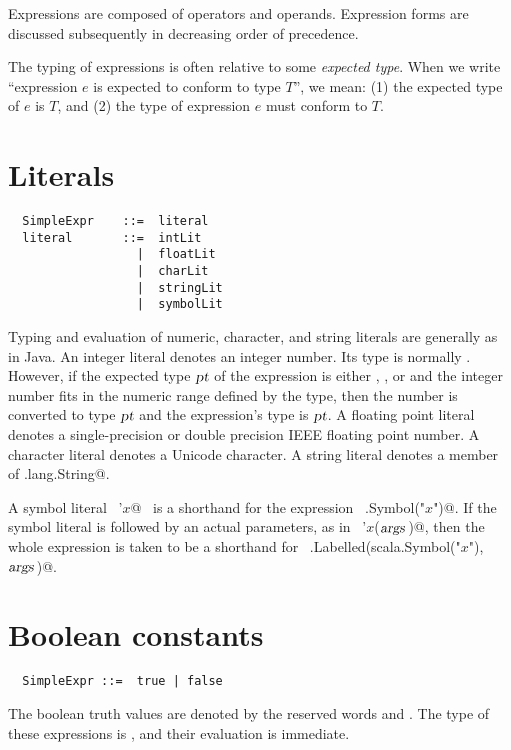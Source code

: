 \documentclass[a4paper,12pt,twoside,titlepage]{book}
\newcommand{\args}{\mbox{\sl args}}
\newcommand{\proto}{\mbox{\sl pt}}
\begin{document}
Expressions are composed of operators and operands. Expression forms are
discussed subsequently in decreasing order of precedence. 

The typing of expressions is often relative to some {\em expected
type}.  When we write ``expression $e$ is expected to conform to
type $T$'', we mean: (1) the expected type of $e$ is
$T$, and (2) the type of expression $e$ must conform to
$T$.

\section{Literals}

\syntax\begin{lstlisting}
  SimpleExpr    ::=  literal
  literal       ::=  intLit
                  |  floatLit
                  |  charLit
                  |  stringLit
                  |  symbolLit
\end{lstlisting}

Typing and evaluation of numeric, character, and string literals are
generally as in Java.  An integer literal denotes an integer
number. Its type is normally . However, if the expected type
$\proto$ of the expression is either , , or
 and the integer number fits in the numeric range defined
by the type, then the number is converted to type $\proto$ and the
expression's type is $\proto$.  A floating point literal denotes a
single-precision or double precision IEEE floating point number. A
character literal denotes a Unicode character. A string literal
denotes a member of \lstinline@java.lang.String@.

A symbol literal ~\lstinline@'$x$@~ is a shorthand for the expression
~\lstinline@scala.Symbol("$x$")@. If the symbol literal is followed by an
actual parameters, as in ~\lstinline@'$x$($\args\,$)@, then the whole expression
is taken to be a shorthand for
~\lstinline@scala.Labelled(scala.Symbol("$x$"), $\args\,$)@.

\section{Boolean constants}

\begin{lstlisting}
  SimpleExpr ::=  true | false
\end{lstlisting}

The boolean truth values are denoted by the reserved words 
and . The type of these expressions is , and
their evaluation is immediate. 
\end{document}
